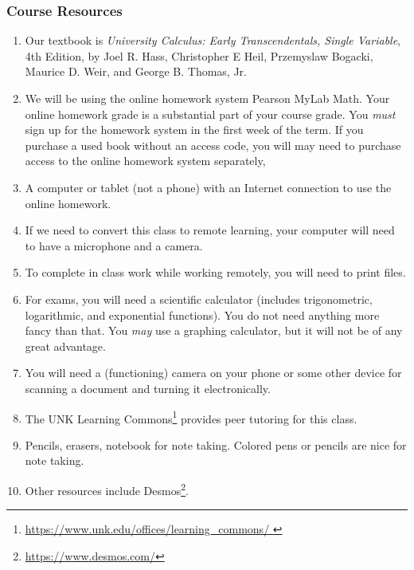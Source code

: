 \documentclass[12pt]{article}
\newcounter{ex}\setcounter{ex}{0}
\begin{document}
\subsubsection*{Course Resources}
\begin{enumerate}

    \item Our textbook is \emph{University Calculus: Early Transcendentals, Single Variable},  4th Edition, by Joel R. Hass, Christopher E Heil, Przemyslaw Bogacki,
    Maurice D. Weir,  and George B. Thomas, Jr.
    
    \item We will be using the online homework system Pearson MyLab Math. Your online homework grade is a substantial part of your course grade. You \emph{must} sign up for the homework system in the first week of the term. If you purchase a used book without an access code, you will  may need to purchase access to the online homework system
    separately,
    
    \item A computer or tablet (not a phone) with an Internet connection to use the online homework.
    
    \item  If we need to convert this class to remote learning, your computer will need to have a microphone and a camera.
    
    \item To complete in class work while working remotely, you will need to print files.
    
    \item For exams, you will need a scientific calculator (includes trigonometric, logarithmic, and exponential functions).  You do not need anything more fancy than that. You \emph{may} use a graphing
    calculator, but it will not be of any great advantage.
    
    \item You will need a (functioning) camera on your phone or some other device for scanning a document and turning it electronically. 
    
    \item The UNK Learning Commons\footnote{\url{https://www.unk.edu/offices/learning_commons/ }} provides peer tutoring for this class. 
        
    \item Pencils, erasers, notebook for note taking. Colored pens or pencils are nice for note taking.
    
     \item Other resources include Desmos\footnote{\url{https://www.desmos.com/}}.    
     \end{enumerate}
\end{document}
